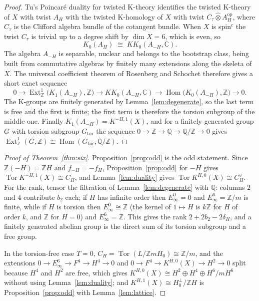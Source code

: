 \documentclass[reqno,11pt]{amsart}
\theoremstyle{definition}
\newcommand{\ZZ}{\mathbb{Z}}
\newcommand{\QQ}{\mathbb{Q}}
\newcommand{\CC}{\mathbb{C}}
\newcommand{\KK}{K\!K}
\DeclareMathOperator{\Tor}{Tor}
\DeclareMathOperator{\Hom}{Hom}
\DeclareMathOperator{\Ext}{Ext}
\begin{document}
\begin{proof}
Tu's Poincar\'e duality for twisted K-theory \cite[Theorem~3.1]{Tu09} identifies the twisted K-theory of $X$ with twist $A_H$ with the twisted K-homology of $X$ with twist $C_\tau\hat\otimes A_H^{\mathrm{op}}$, where $C_\tau$ is the Clifford algebra bundle of the cotangent bundle. When $X$ is spin$^c$ the twist $C_\tau$ is trivial up to a degree shift by $\dim X=6$, which is even, so
\[
K_0(A_H)\;\cong\;\KK_0(A_{-H},\CC).
\]
The algebra $A_{-H}$ is separable, nuclear and belongs to the bootstrap class, being built from commutative algebras by finitely many extensions along the skeleta of $X$. The universal coefficient theorem of Rosenberg and Schochet \cite{RS87} therefore gives a short exact sequence
\[
0\longrightarrow\Ext^1_\ZZ\bigl(K_1(A_{-H}),\ZZ\bigr)\longrightarrow\KK_0(A_{-H},\CC)\longrightarrow\Hom\bigl(K_0(A_{-H}),\ZZ\bigr)\longrightarrow0 .
\]
The K-groups are finitely generated by Lemma~\ref{lem:degenerate}, so the last term is free and the first is finite; the first term is therefore the torsion subgroup of the middle one. Finally $K_1(A_{-H})=K^{-H,1}(X)$, and for a finitely generated group $G$ with torsion subgroup $G_{\mathrm{tor}}$ the sequence $0\to\ZZ\to\QQ\to\QQ/\ZZ\to0$ gives $\Ext^1_\ZZ(G,\ZZ)\cong\Hom(G_{\mathrm{tor}},\QQ/\ZZ)$.
\end{proof}

\begin{proof}[Proof of Theorem~\ref{thm:six}]
Proposition~\ref{prop:odd} is the odd statement. Since $\ZZ(-H)=\ZZ H$ and $f_{-H}=-f_H$, Proposition~\ref{prop:odd} for $-H$ gives $\Tor K^{-H,1}(X)\cong C_H$, and Lemma~\ref{lem:duality} gives $\Tor K^{H,0}(X)\cong C_H^\vee$. For the rank, tensor the filtration of Lemma~\ref{lem:degenerate} with $\QQ$: columns $2$ and $4$ contribute $b_2$ each; if $H$ has infinite order then $E^0_\infty=0$ and $E^6_\infty=\ZZ/m$ is finite, while if $H$ is torsion then $E^0_\infty\cong\ZZ$ (the kernel of $1\mapsto H$ is $k\ZZ$ for $H$ of order $k$, and $\ZZ$ for $H=0$) and $E^6_\infty=\ZZ$. This gives the rank $2+2b_2-2\delta_H$, and a finitely generated abelian group is the direct sum of its torsion subgroup and a free group.

In the torsion-free case $T=0$, $C_H=\Tor(L/\ZZ mH_0)\cong\ZZ/m$, and the extensions $0\to E_\infty^6\to F^4\to H^4\to0$ and $0\to F^4\to K^{H,0}(X)\to H^2\to0$ split because $H^4$ and $H^2$ are free, which gives $K^{H,0}(X)\cong H^2\oplus H^4\oplus H^6/mH^6$ without using Lemma~\ref{lem:duality}; and $K^{H,1}(X)\cong H_0^\perp/\ZZ H$ is Proposition~\ref{prop:odd} with Lemma~\ref{lem:lattice}.
\end{proof}
\end{document}

